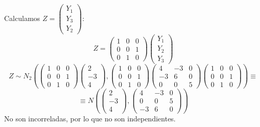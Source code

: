 \documentclass[11pt,a4paper]{article}
\begin{document}
\begin{enumerate}[label=\arabic*.]
\begin{enumerate}[label=\alph*)]
Calculamos $Z = \begin{pmatrix} Y_{1} \\ Y_{3} \\ Y_{2} \end{pmatrix}$:
$$Z = \begin{pmatrix}
1 & 0 & 0 \\
0 & 0 & 1 \\
0 & 1 & 0
\end{pmatrix} \begin{pmatrix} Y_{1} \\ Y_{2} \\ Y_{3} \end{pmatrix}$$
$$Z \sim N_{2}(\begin{pmatrix}
1 & 0 & 0 \\
0 & 0 & 1 \\
0 & 1 & 0
\end{pmatrix} \begin{pmatrix} 2 \\ -3 \\ 4 \end{pmatrix}, \begin{pmatrix}
1 & 0 & 0 \\
0 & 0 & 1 \\
0 & 1 & 0
\end{pmatrix} \begin{pmatrix}
4 & -3 & 0 \\
-3 & 6 & 0 \\
0 & 0 & 5
\end{pmatrix} \begin{pmatrix}
1 & 0 & 0 \\
0 & 0 & 1 \\
0 & 1 & 0
\end{pmatrix}) \equiv$$
$$\equiv N(\begin{pmatrix} 2 \\ -3 \\ 4 \end{pmatrix}, \begin{pmatrix}
4 & -3 & 0 \\
0 & 0 & 5 \\
-3 & 6 & 0
\end{pmatrix})$$
No son incorreladas, por lo que no son independientes.
\end{enumerate}


\end{enumerate}
\end{document}
